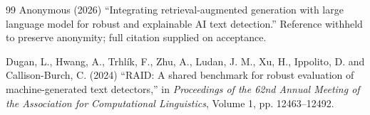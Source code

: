 \documentclass{article}
\begin{document}
\begin{thebibliography}{99}
 Anonymous (2026) ``Integrating retrieval-augmented
generation with large language model for robust and explainable AI text
detection.'' Reference withheld to preserve anonymity; full citation
supplied on acceptance.

 Dugan, L., Hwang, A., Trhl{\'i}k, F., Zhu, A., Ludan,
J. M., Xu, H., Ippolito, D. and Callison-Burch, C. (2024) ``RAID: A shared
benchmark for robust evaluation of machine-generated text detectors,'' in
\emph{Proceedings of the 62nd Annual Meeting of the Association for
Computational Linguistics}, Volume 1, pp. 12463--12492.

\end{thebibliography}
\end{document}
